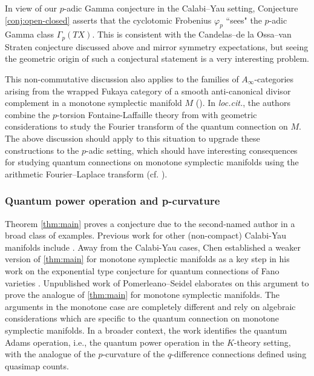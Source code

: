 \documentclass[reqno]{amsart}
\numberwithin{equation}{section}
\numberwithin{equation}{section}
\numberwithin{equation}{section}
\theoremstyle{definition}
\theoremstyle{remark}
\theoremstyle{remark}
\begin{document}
In view of our $p$-adic Gamma conjecture in the Calabi--Yau setting, Conjecture \ref{conj:open-closed} asserts that the cyclotomic Frobenius $\varphi_p$ ``sees" the $p$-adic Gamma class $\Gamma_p(TX)$. This is consistent with the Candelas--de la Ossa--van Straten conjecture discussed above and mirror symmetry expectations, but seeing the geometric origin of such a conjectural statement is a very interesting problem.

This non-commutative discussion also applies to the families of $A_\infty$-categories arising from the wrapped Fukaya category of a smooth anti-canonical divisor complement in a monotone symplectic manifold $M$ (\cite{PS23}). In \emph{loc.cit.}, the authors combine the $p$-torsion Fontaine-Laffaille theory from \cite{PVV} with geometric considerations to study the Fourier transform of the quantum connection on $M$. The above discussion should apply to this situation to upgrade these constructions to the $p$-adic setting, which should have interesting consequences for studying quantum connections on monotone symplectic manifolds using the arithmetic Fourier--Laplace transform (cf. \cite{kedlaya-fourier}).
 

\subsubsection{Quantum power operation and p-curvature}
Theorem \ref{thm:main} proves a conjecture due to the second-named author \cite{Lee23b} in a broad class of examples. Previous work for other (non-compact) Calabi-Yau manifolds include \cite{Lee23a, bai-lee}. Away from the Calabi-Yau cases, Chen established a weaker version of \cref{thm:main} for monotone symplectic manifolds as a key step in his work on the exponential type conjecture for quantum connections of Fano varieties \cite{chen2024exponential}. Unpublished work of Pomerleano--Seidel elaborates on this argument to prove the analogue of \cref{thm:main} for monotone symplectic manifolds. The arguments in the monotone case are completely different and rely on algebraic considerations which are specific to the quantum connection on monotone symplectic manifolds. In a broader context, the work \cite{bai2025quantum} identifies the quantum Adams operation, i.e., the quantum power operation in the $K$-theory setting, with the analogue of the $p$-curvature of the $q$-difference connections defined using quasimap counts.
\end{document}
